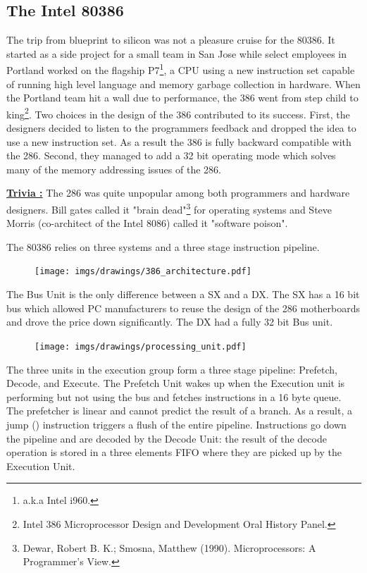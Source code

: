 \documentclass[book.tex]{subfiles}
\begin{document}
\subsection{The Intel 80386}
The trip from blueprint to silicon was not a pleasure cruise for the 80386. It started as a side project for a small team in San Jose while select employees in Portland worked on the flagship P7\footnote{a.k.a Intel i960.}, a CPU using a new instruction set capable of running high level language and memory garbage collection in hardware. When the Portland team hit a wall due to performance, the 386 went from step child to king\footnote{Intel 386 Microprocessor Design and Development Oral History Panel.}. Two choices in the design of the 386 contributed to its success. First, the designers decided to listen to the programmers feedback and dropped the idea to use a new instruction set. As a result the 386 is fully backward compatible with the 286. Second, they managed to add a 32 bit operating mode which solves many of the memory addressing issues of the 286.\\
\par
\textbf{\underline{Trivia :}}  The 286 was quite unpopular among both programmers and hardware designers. Bill gates called it "brain dead"\footnote{Dewar, Robert B. K.; Smosna, Matthew (1990). Microprocessors: A Programmer's View.} for operating systems and Steve Morris (co-architect of the Intel 8086) called it "software poison".\\
\par
The 80386 relies on three systems and a three stage instruction pipeline.\\
\par
\begin{figure}[H]
\centering
\texttt{[image: imgs/drawings/386\_architecture.pdf]}
\end{figure}
\par
The Bus Unit is the only difference between a SX and a DX. The SX has a 16 bit bus which allowed PC manufacturers to reuse the design of the 286 motherboards and drove the price down significantly. The DX had a fully 32 bit Bus unit.
\par
\begin{figure}[H]
\centering
\texttt{[image: imgs/drawings/processing\_unit.pdf]}
\end{figure}
\par
The three units in the execution group form a three stage pipeline: Prefetch, Decode, and Execute. The Prefetch Unit wakes up when the Execution unit is performing but not using the bus and fetches instructions in a 16 byte queue. The prefetcher is linear and cannot predict the result of a branch. As a result, a jump () instruction triggers a flush of the entire pipeline. Instructions go down the pipeline and are decoded by the Decode Unit: the result of the decode operation is stored in a three elements FIFO where they are picked up by the Execution Unit.\\
\par
\end{document}

